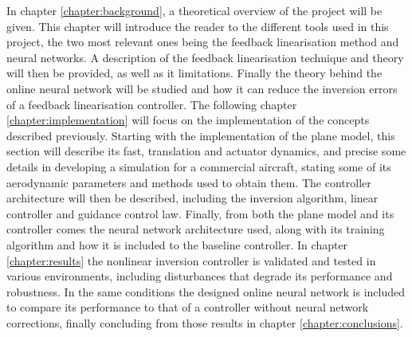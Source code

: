 In chapter \ref{chapter:background}, a theoretical overview of the project will be given. This chapter will introduce the reader to the different tools used in this project, the two most relevant ones being the feedback linearisation method and neural networks. A description of the feedback linearisation technique and theory will then be provided, as well as it limitations. Finally the theory behind the online neural network will be studied and how it can reduce the inversion errors of a feedback linearisation controller.
The following chapter \ref{chapter:implementation} will focus on the implementation of the concepts described previously. Starting with the implementation of the plane model, this section will describe its fast, translation and actuator dynamics, and precise some details in developing a simulation for a commercial aircraft, stating some of its aerodynamic parameters and methods used to obtain them. The controller architecture will then be described, including the inversion algorithm, linear controller and guidance control law. Finally, from both the plane model and its controller comes the neural network architecture used, along with its training algorithm and how it is included to the baseline controller. In chapter \ref{chapter:results} the nonlinear inversion controller is validated and tested in various environments, including disturbances that degrade its performance and robustness. In the same conditions the designed online neural network is included to compare its performance to that of a controller without neural network corrections, finally concluding from those results in chapter \ref{chapter:conclusions}.

